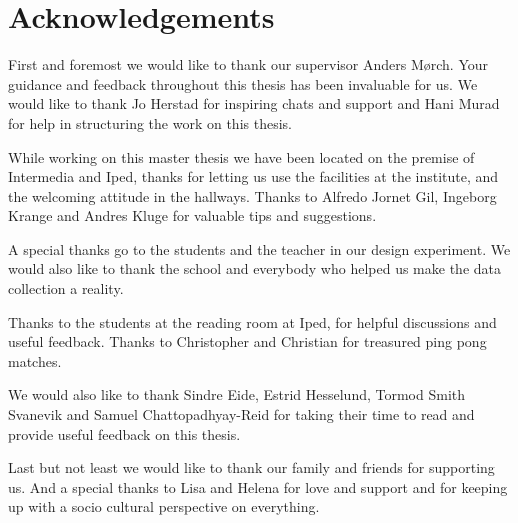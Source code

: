 \section*{Acknowledgements}
First and foremost we would like to thank our supervisor Anders Mørch. Your guidance and feedback throughout this thesis has been invaluable for us. We would like to thank Jo Herstad for inspiring chats and support and Hani Murad for help in structuring the work on this thesis. 

While working on this master thesis we have been located on the premise of Intermedia and Iped, thanks for letting us use the facilities at the institute, and the welcoming attitude in the hallways. Thanks to Alfredo Jornet Gil, Ingeborg Krange and Andres Kluge for valuable tips and suggestions.

A special thanks go to the students and the teacher in our design experiment. We would also like to thank the school and everybody who helped us make the data collection a reality.

Thanks to the students at the reading room at Iped, for helpful discussions and useful feedback. Thanks to Christopher and Christian for treasured ping pong matches.

We would also like to thank Sindre Eide, Estrid Hesselund, Tormod Smith Svanevik and Samuel Chattopadhyay-Reid for taking their time to read and provide useful feedback on this thesis.

Last but not least we would like to thank our family and friends for supporting us. And a special thanks to Lisa and Helena for love and support and for keeping up with a socio cultural perspective on everything.



\newpage